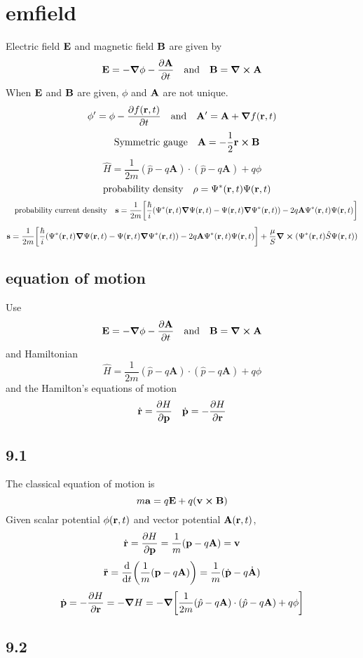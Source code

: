 \section*{emfield}
Electric field $\vb{E}$ and magnetic field $\vb{B}$
are given by 
\begin{align*}
\vb{E}=-\grad{\phi}-\pdv{\vb{A}}{t}\qq{and}\vb{B}=\curl{\vb{A}}
\end{align*}
When $\vb{E}$ and $\vb{B}$ are given, $\phi$ and $\vb{A}$ are not unique.
\begin{align*}
\phi'=\phi-\pdv{f(\vb{r},t)}{t}\qq{and}\vb{A'}=\vb{A}+\grad{f(\vb{r},t)}
\end{align*}
\[\qq{Symmetric gauge} \vb{A}=-\frac{1}{2}\vb{r}\cp\vb{B}\]
\[\hat{H}=\frac{1}{2m}(\hat{p}-q\mathbf{A})\cdot(\hat{p}-q\mathbf{A})+ q\phi\]
\[\qq{probability density}\rho=\Psi^*(\vb{r},t)\Psi(\vb{r},t)\]
\[\qq{probability current density}\vb{s}=\frac{1}{2m}\qty[\frac{\hbar}{i}(\Psi^*(\vb{r},t)\grad{\Psi(\vb{r},t)}-\Psi(\vb{r},t)\grad{\Psi^*(\vb{r},t)})-2q\vb{A}\Psi^*(\vb{r},t)\Psi(\vb{r},t)]\]
\[\vb{s}=\frac{1}{2m}\qty[\frac{\hbar}{i}(\Psi^*(\vb{r},t)\grad{\Psi(\vb{r},t)}-\Psi(\vb{r},t)\grad{\Psi^*(\vb{r},t)})-2q\vb{A}\Psi^*(\vb{r},t)\Psi(\vb{r},t)]+\frac{\mu}{S}\curl{(\Psi^*(\vb{r},t)\hat{S}\Psi(\vb{r},t))}\]
\subsection*{equation of motion}
Use \[\vb{E}=-\grad{\phi}-\pdv{\vb{A}}{t}\qq{and}\vb{B}=\curl{\vb{A}}\]
and Hamiltonian \[\hat{H}=\frac{1}{2m}(\hat{p}-q\mathbf{A})\cdot(\hat{p}-q\mathbf{A})+ q\phi\]
and the Hamilton's equations of motion \[\dot{\vb{r}}=\pdv{H}{\vb{p}}\quad\dot{\vb{p}}=-\pdv{H}{\vb{r}}\]
\subsection*{9.1}
The classical equation of motion is \[m\vb{a}=q\vb{E}+q(\vb{v}\cp\vb{B})\]
Given scalar potential $\phi(\vb{r},t)$ and vector potential $\vb{A}(\vb{r},t)$, 
\[\dot{\vb{r}}=\pdv{H}{\vb{p}}=\frac{1}{m}(\vb{p}-q\vb{A})=\vb{v}\]
\[\ddot{\vb{r}}=\dv{t}\qty(\frac{1}{m}(\vb{p}-q\vb{A}))=\frac{1}{m}(\dot{\vb{p}}-q\dot{\vb{A}})\]
\[\dot{\vb{p}}=-\pdv{H}{\vb{r}}=-\grad{H}=-\grad{\qty[\frac{1}{2m}(\hat{p}-q\mathbf{A})\cdot(\hat{p}-q\mathbf{A})+ q\phi]}\]
\subsection*{9.2}
\newpage

